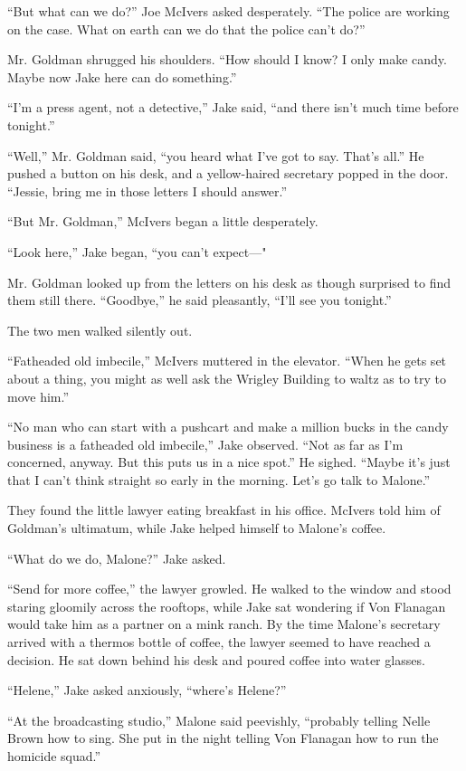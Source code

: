 \documentclass{novel}
\begin{document}
“But what can we do?” Joe McIvers asked desperately. “The police are working on the case. What on earth can we do that the police can’t do?”

Mr. Goldman shrugged his shoulders. “How should I know? I only make candy. Maybe now Jake here can do something.”

“I’m a press agent, not a detective,” Jake said, “and there isn’t much time before tonight.”

“Well,” Mr. Goldman said, “you heard what I've got to say. That’s all.” He pushed a button on his desk, and a yellow-haired secretary popped in the door. “Jessie, bring me in those letters I should answer.”

“But Mr. Goldman,” McIvers began a little desperately.

“Look here,” Jake began, “you can’t expect—"

Mr. Goldman looked up from the letters on his desk as though surprised to find them still there. “Goodbye,” he said pleasantly, “I’ll see you tonight.”

The two men walked silently out.

“Fatheaded old imbecile,” McIvers muttered in the elevator. “When he gets set about a thing, you might as well ask the Wrigley Building to waltz as to try to move him.”

“No man who can start with a pushcart and make a million bucks in the candy business is a fatheaded old imbecile,” Jake observed. “Not as far as I’m concerned, anyway. But this puts us in a nice spot.” He sighed. “Maybe it’s just that I can’t think straight so early in the morning. Let’s go talk to Malone.”

They found the little lawyer eating breakfast in his office. McIvers told him of Goldman’s ultimatum, while Jake helped himself to Malone’s coffee.

“What do we do, Malone?” Jake asked.

“Send for more coffee,” the lawyer growled. He walked to the window and stood staring gloomily across the rooftops, while Jake sat wondering if Von Flanagan would take him as a partner on a mink ranch. By the time Malone’s secretary arrived with a thermos bottle of coffee, the lawyer seemed to have reached a decision. He sat down behind his desk and poured coffee into water glasses.

“Helene,” Jake asked anxiously, “where’s Helene?”

“At the broadcasting studio,” Malone said peevishly, “probably telling Nelle Brown how to sing. She put in the night telling Von Flanagan how to run the homicide squad.”
\end{document}
